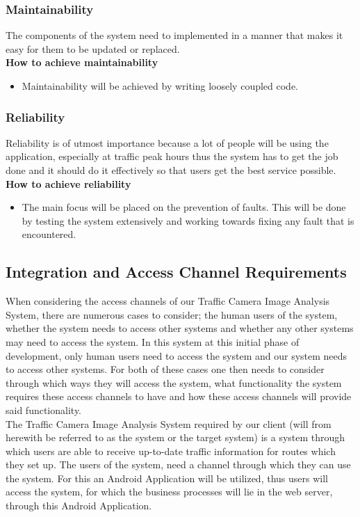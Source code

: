 \documentclass[a4paper,12pt]{article}
\begin{document}
\subsubsection{Maintainability}
The components of the system need to implemented in a manner that makes it easy for them to be updated or replaced.\\
\textbf{How to achieve maintainability}
\begin{itemize}
\item Maintainability will be achieved by writing loosely coupled code.
\end{itemize}
\subsubsection{Reliability}
Reliability is of utmost importance because a lot of people will be using the application, especially at traffic peak hours thus the system has to get the job done and it should do it effectively so that users get the best service possible. \\
\textbf{How to achieve reliability} \\
\begin{itemize}
\item The main focus will be placed on the prevention of faults. This will be done by testing the system extensively and working towards fixing any fault that is encountered.
\end{itemize}
\subsection{Integration and Access Channel Requirements}
When considering the access channels of our Traffic Camera Image Analysis System, there are numerous cases to consider; the human users of the system, whether the system  needs to access other systems and whether any other systems may need to access the system. In this system at this initial phase of development, only human users need to access the system and our system needs to access other systems. For both of these cases one then needs to consider through which ways they will access the system, what functionality the system requires these access channels to have and how these access channels will provide said functionality. \\
 
The Traffic Camera Image Analysis System required by our client (will from herewith be referred to as the system or the target system) is a system through which users are able to receive up-to-date traffic information for routes which they set up. The users of the system, need a channel through which they can use the system. For this an Android Application will be utilized, thus users will access the system, for which the business processes will lie in the web server, through this Android Application. \\
\end{document}

